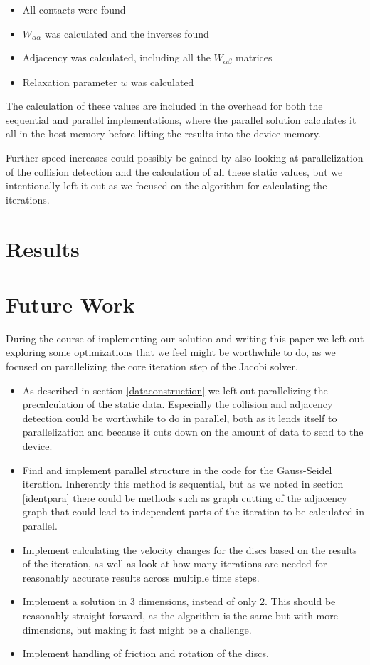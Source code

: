 \documentclass[runningheads,a4paper]{llncs}
\begin{document}
\begin{itemize}
\item All contacts were found
\item $W_{\alpha\alpha}$ was calculated and the inverses found
\item Adjacency was calculated, including all the $W_{\alpha\beta}$ matrices
\item Relaxation parameter $w$ was calculated
\end{itemize}

The calculation of these values are included in the overhead for both
the sequential and parallel implementations,
where the parallel solution calculates it all in the host memory
before lifting the results into the device memory.

Further speed increases could possibly be gained
by also looking at parallelization of the collision detection
and the calculation of all these static values,
but we intentionally left it out as we focused on the algorithm
for calculating the iterations.

\section{Results}

\section{Future Work}
During the course of implementing our solution and writing this
paper we left out exploring some optimizations that we feel
might be worthwhile to do, as we focused on parallelizing
the core iteration step of the Jacobi solver.

\begin{itemize}
\item As described in section \ref{dataconstruction} we left out
  parallelizing the precalculation of the static data.
  Especially the collision and adjacency detection could be worthwhile
  to do in parallel, both as it lends itself to parallelization
  and because it cuts down on the amount of data to send to the device.
\item Find and implement parallel structure in the code for the Gauss-Seidel iteration.
  Inherently this method is sequential, but as we noted in section \ref{identpara}
  there could be methods such as graph cutting of the adjacency graph
  that could lead to independent parts of the iteration to be calculated in parallel.
\item Implement calculating the velocity changes for the discs based
  on the results of the iteration, as well as look at how many iterations are needed
  for reasonably accurate results across multiple time steps.
\item Implement a solution in 3 dimensions, instead of only 2.
  This should be reasonably straight-forward, as the algorithm is the same
  but with more dimensions, but making it fast might be a challenge.
\item Implement handling of friction and rotation of the discs.
\end{itemize}
\end{document}
